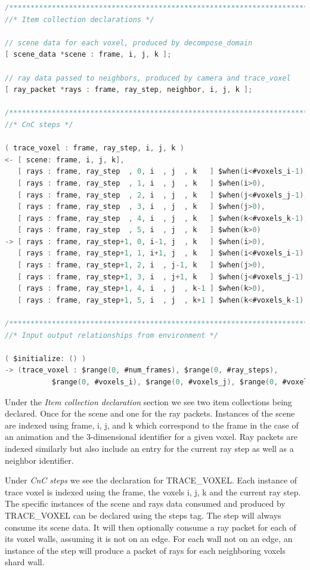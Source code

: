 \begin{lstlisting}[language=c,basicstyle=\tiny]
/******************************************************************************
//* Item collection declarations */

// scene data for each voxel, produced by decompose_domain
[ scene_data *scene : frame, i, j, k ];

// ray data passed to neighbors, produced by camera and trace_voxel
[ ray_packet *rays : frame, ray_step, neighbor, i, j, k ];

/******************************************************************************
//* CnC steps */

( trace_voxel : frame, ray_step, i, j, k )
<- [ scene: frame, i, j, k],
   [ rays : frame, ray_step  , 0, i  , j  , k   ] $when(i<#voxels_i-1),
   [ rays : frame, ray_step  , 1, i  , j  , k   ] $when(i>0),
   [ rays : frame, ray_step  , 2, i  , j  , k   ] $when(j<#voxels_j-1),
   [ rays : frame, ray_step  , 3, i  , j  , k   ] $when(j>0),
   [ rays : frame, ray_step  , 4, i  , j  , k   ] $when(k<#voxels_k-1),
   [ rays : frame, ray_step  , 5, i  , j  , k   ] $when(k>0)
-> [ rays : frame, ray_step+1, 0, i-1, j  , k   ] $when(i>0),
   [ rays : frame, ray_step+1, 1, i+1, j  , k   ] $when(i<#voxels_i-1),
   [ rays : frame, ray_step+1, 2, i  , j-1, k   ] $when(j>0),
   [ rays : frame, ray_step+1, 3, i  , j+1, k   ] $when(j<#voxels_j-1),
   [ rays : frame, ray_step+1, 4, i  , j  , k-1 ] $when(k>0),
   [ rays : frame, ray_step+1, 5, i  , j  , k+1 ] $when(k<#voxels_k-1);

/******************************************************************************
//* Input output relationships from environment */

( $initialize: () )
-> (trace_voxel : $range(0, #num_frames), $range(0, #ray_steps),
           $range(0, #voxels_i), $range(0, #voxels_j), $range(0, #voxels_k));


\end{lstlisting} 

Under the \emph{Item collection declaration} section we see two item collections being declared.  Once for the scene and one for the ray packets.  Instances of the scene are indexed using frame, i, j, and k which correspond to the frame in the case of an animation and the 3-dimensional identifier for a given voxel.  Ray packets are indexed similarly but also include an entry for the current ray step as well as a neighbor identifier.

Under \emph{CnC steps} we see the declaration for TRACE\_VOXEL.  Each instance of trace voxel is indexed using the frame, the voxels i, j, k and the current ray step.  The specific instances of the scene and rays data consumed and produced by TRACE\_VOXEL can be declared using the steps tag.  The step will always consume its scene data.  It will then optionally consume a ray packet for each of its voxel walls, assuming it is not on an edge.  For each wall not on an edge, an instance of the step will produce a packet of rays for 
each neighboring voxels shard wall.

